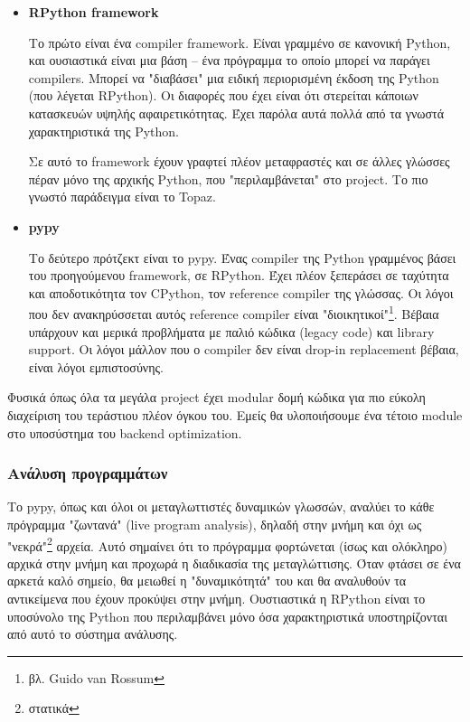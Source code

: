 \begin{itemize}

\item \textbf{RPython framework}

Το πρώτο είναι ένα compiler framework. Είναι γραμμένο σε κανονική Python, και
ουσιαστικά είναι μια βάση – ένα πρόγραμμα το οποίο μπορεί να παράγει compilers.
Μπορεί να "διαβάσει" μια ειδική περιορισμένη έκδοση της Python (που λέγεται
RPython). Οι διαφορές που έχει είναι ότι στερείται κάποιων κατασκευών υψηλής
αφαιρετικότητας. Έχει παρόλα αυτά πολλά από τα γνωστά χαρακτηριστικά της Python.

Σε αυτό το framework έχουν γραφτεί πλέον μεταφραστές και σε άλλες γλώσσες πέραν
μόνο της αρχικής Python, που "περιλαμβάνεται" στο project. Το πιο γνωστό
παράδειγμα είναι το Topaz\cite{topaz}.


\item \textbf{pypy}

Το δεύτερο πρότζεκτ είναι το pypy. Ένας compiler της Python γραμμένος βάσει του
προηγούμενου framework, σε RPython. Έχει πλέον ξεπεράσει σε ταχύτητα και
αποδοτικότητα τον CPython, τον reference compiler της γλώσσας. Οι λόγοι που δεν
ανακηρύσσεται αυτός reference compiler είναι "διοικητικοί"\footnote{βλ. Guido
van Rossum}. Βέβαια υπάρχουν και μερικά προβλήματα με παλιό κώδικα (legacy code)
και library support. Οι λόγοι μάλλον που ο compiler δεν είναι drop-in
replacement βέβαια, είναι λόγοι εμπιστοσύνης.

\end{itemize}

Φυσικά όπως όλα τα μεγάλα project έχει modular δομή κώδικα για πιο εύκολη
διαχείριση του τεράστιου πλέον όγκου του. Εμείς θα υλοποιήσουμε ένα τέτοιο
module στο υποσύστημα του backend optimization.

\subsubsection{Ανάλυση προγραμμάτων}

Το pypy, όπως και όλοι οι μεταγλωττιστές δυναμικών γλωσσών, αναλύει το κάθε
πρόγραμμα "ζωντανά" (live program analysis), δηλαδή στην μνήμη και όχι ως
"νεκρά"\footnote{στατικά} αρχεία. Αυτό σημαίνει ότι το πρόγραμμα φορτώνεται
(ίσως και ολόκληρο) αρχικά στην μνήμη και προχωρά η διαδικασία της
μεταγλώττισης. Όταν φτάσει σε ένα αρκετά καλό σημείο, θα μειωθεί η
"δυναμικότητά" του και θα αναλυθούν τα αντικείμενα που έχουν προκύψει στην
μνήμη. Ουστιαστικά η RPython είναι το υποσύνολο της Python που περιλαμβάνει μόνο
όσα χαρακτηριστικά υποστηρίζονται από αυτό το σύστημα ανάλυσης.

